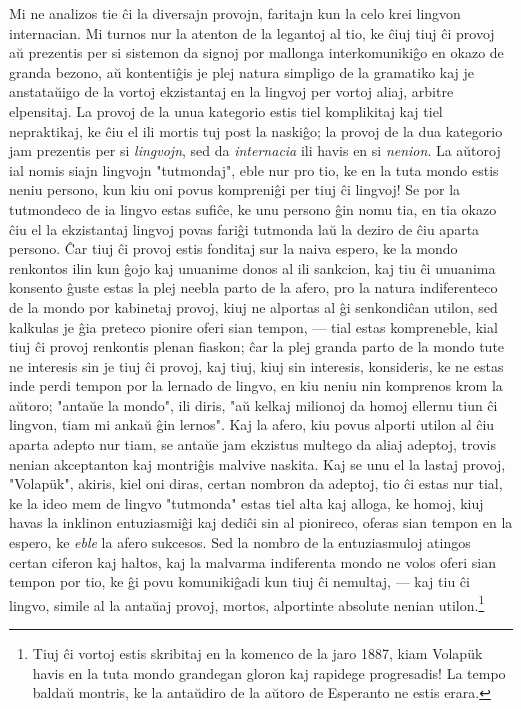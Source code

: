    Mi ne analizos tie \^ci la diversajn provojn, faritajn kun la celo
krei lingvon internacian. Mi turnos nur la atenton de la legantoj al
tio, ke \^ciuj tiuj \^ci provoj a\u u prezentis per si sistemon da
signoj por mallonga interkomuniki\^go en okazo de granda bezono, a\u
u kontenti\^gis je plej natura simpligo de la gramatiko kaj je
anstata\u uigo de la vortoj ekzistantaj en la lingvoj per vortoj
aliaj, arbitre elpensitaj. La provoj de la unua kategorio estis tiel
komplikitaj kaj tiel nepraktikaj, ke \^ciu el ili mortis tuj post la
naski\^go; la provoj de la dua kategorio jam prezentis per si {\sl
lingvojn}, sed da {\sl internacia} ili havis en si {\sl nenion}. La
a\u utoroj ial nomis siajn lingvojn "tutmondaj", eble nur pro tio,
ke en la tuta mondo estis neniu persono, kun kiu oni povus
kompreni\^gi per tiuj \^ci lingvoj! Se por la tutmondeco de ia
lingvo estas sufi\^ce, ke unu persono \^gin nomu tia, en tia okazo
\^ciu el la ekzistantaj lingvoj povas fari\^gi tutmonda la\u u la
deziro de \^ciu aparta persono. \^Car tiuj \^ci provoj estis
fonditaj sur la naiva espero, ke la mondo renkontos ilin kun \^gojo
kaj unuanime donos al ili sankcion, kaj tiu \^ci unuanima konsento
\^guste estas la plej neebla parto de la afero, pro la natura
indiferenteco de la mondo por kabinetaj provoj, kiuj ne alportas al
\^gi senkondi\^can utilon, sed kalkulas je \^gia preteco pionire
oferi sian tempon, --- tial estas kompreneble, kial tiuj \^ci provoj
renkontis plenan fiaskon; \^car la plej granda parto de la mondo
tute ne interesis sin je tiuj \^ci provoj, kaj tiuj, kiuj sin
interesis, konsideris, ke ne estas inde perdi tempon por la lernado
de lingvo, en kiu neniu nin komprenos krom la a\u utoro; "anta\u ue
la mondo", ili diris, "a\u u kelkaj milionoj da homoj ellernu tiun
\^ci lingvon, tiam mi anka\u u \^gin lernos". Kaj la afero, kiu
povus alporti utilon al \^ciu aparta adepto nur tiam, se anta\u ue
jam ekzistus multego da aliaj adeptoj, trovis nenian akceptanton kaj
montri\^gis malvive naskita. Kaj se unu el la lastaj provoj,
"Volap\"uk", akiris, kiel oni diras, certan nombron da adeptoj,
tio \^ci estas nur tial, ke la ideo mem de lingvo "tutmonda" estas
tiel alta kaj alloga, ke homoj, kiuj havas la inklinon
entuziasmi\^gi kaj dedi\^ci sin al pionireco, oferas sian tempon en
la espero, ke {\sl eble} la afero sukcesos. Sed la nombro de la
entuziasmuloj atingos certan ciferon kaj haltos, kaj la malvarma
indiferenta mondo ne volos oferi sian tempon por tio, ke \^gi povu
komuniki\^gadi kun tiuj \^ci nemultaj,
--- kaj tiu \^ci lingvo, simile al la anta\u uaj provoj, mortos,
alportinte absolute nenian utilon.\footnote{Tiuj \^ci vortoj estis
skribitaj en la komenco de la jaro 1887, kiam Volap\"uk havis en la
tuta mondo grandegan gloron kaj rapidege progresadis! La tempo
balda\u u montris, ke la anta\u udiro de la a\u utoro de Esperanto
ne estis erara.}

